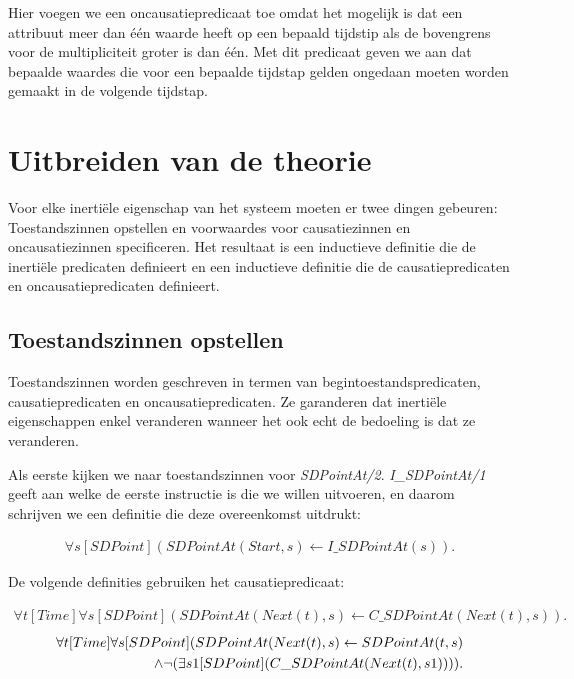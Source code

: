 Hier voegen we een oncausatiepredicaat toe omdat het mogelijk is dat een attribuut meer dan \'e\'en waarde heeft op een bepaald tijdstip als de bovengrens voor de multipliciteit groter is dan \'e\'en. Met dit predicaat geven we aan dat bepaalde waardes die voor een bepaalde tijdstap gelden ongedaan moeten worden gemaakt in de volgende tijdstap.

\section{Uitbreiden van de theorie}
Voor elke inerti\"ele eigenschap van het systeem moeten er twee dingen gebeuren: Toestandszinnen opstellen en voorwaardes voor causatiezinnen en oncausatiezinnen specificeren. Het resultaat is een inductieve definitie die de inerti\"ele predicaten definieert en een inductieve definitie die de causatiepredicaten en oncausatiepredicaten definieert.

\subsection{Toestandszinnen opstellen}
Toestandszinnen worden geschreven in termen van begintoestandspredicaten, causatiepredicaten en oncausatiepredicaten. Ze garanderen dat inerti\"ele eigenschappen enkel veranderen wanneer het ook echt de bedoeling is dat ze veranderen.

Als eerste kijken we naar toestandszinnen voor \textit{SDPointAt/2}. \textit{I\_SDPointAt/1} geeft aan welke de eerste instructie is die we willen uitvoeren, en daarom schrijven we een definitie die deze overeenkomst uitdrukt:

\begin{align}
	\forall{s}[SDPoint](SDPointAt(Start, s) \leftarrow I\_SDPointAt(s)).
\end{align}


De volgende definities gebruiken het causatiepredicaat:

\begin{align}
	\forall{t}[Time]\forall{s}[SDPoint](SDPointAt(Next(t), s) \leftarrow C\_SDPointAt(Next(t), s)). \label{eq:sdcauses}
\end{align}
\begin{align}
	\forall{t}[Time]\forall{s}[SDPoint](SDPointAt(Next(t), s) \leftarrow SDPointAt(t, s) \nonumber \\ \land{} \space \lnot{}(\exists{s1}[SDPoint](C\_SDPointAt(Next(t), s1)))). \label{eq:sduncauses}
\end{align}

